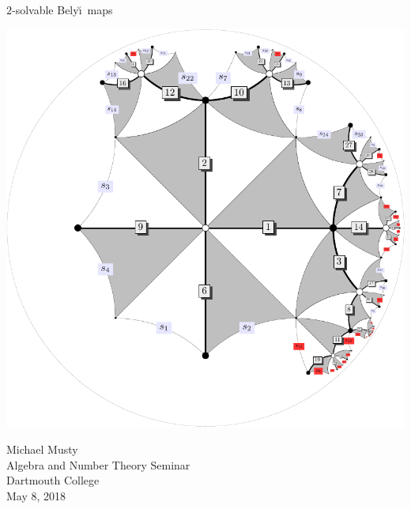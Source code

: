 \documentclass[xcolor=dvipsnames]{beamer}
\theoremstyle{plain}
\newcommand{\Belyi}{Bely\u{\i}}
\begin{document}
  \begin{frame}[plain]
    \begin{center}{
      \Huge\color{SeaGreen}
      $2$-solvable
      \Belyi\ maps
    }
    \end{center}
    \begin{center}
      \includegraphics[scale = 0.3]{32S2-g5.pdf}
    \end{center}
    \begin{center}
      Michael Musty\\
      Algebra and Number Theory Seminar\\
      Dartmouth College\\
      May 8, 2018
    \end{center}
  \end{frame}
\end{document}

